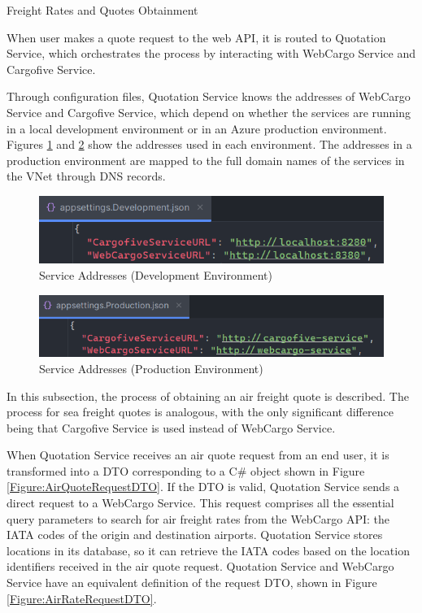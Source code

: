 \documentclass[12pt,reqno, oneside]{amsbook}
\makeatletter
\def\subsection{\@startsection{subsection}{2}%
      \z@{.5\linespacing\@plus.7\linespacing}{.25\linespacing}%
      {\normalfont\bfseries\flushleft}}
\theoremstyle{definition}
\theoremstyle{definition}
\numberwithin{section}{chapter}
\numberwithin{table}{chapter}
\numberwithin{figure}{chapter}
\makeatother
\begin{document}
\pagebreak

\subsection{Freight Rates and Quotes Obtainment}

When user makes a quote request to the web \ac{API}, it is routed to Quotation Service, which orchestrates the process by interacting with WebCargo Service and Cargofive Service.

Through configuration files, Quotation Service knows the addresses of WebCargo Service and Cargofive Service, which depend on whether the services are running in a local development environment or in an Azure production environment. Figures \ref{Figure:ServiceAddressesDevelopment} and \ref{Figure:ServiceAddressesProduction} show the addresses used in each environment. The addresses in a production environment are mapped to the full domain names of the services in the \ac{VNet} through \ac{DNS} records.

\begin{figure}[H]
  \centering
  \includegraphics[width=0.8\linewidth]{images/ServiceAddressesDevelopment.png}
  \caption{\label{Figure:ServiceAddressesDevelopment}Service Addresses (Development Environment)}
\end{figure}

\begin{figure}[H]
  \centering
  \includegraphics[width=0.8\linewidth]{images/ServiceAddressesProduction.png}
  \caption{\label{Figure:ServiceAddressesProduction}Service Addresses (Production Environment)}
\end{figure}

In this subsection, the process of obtaining an air freight quote is described. The process for sea freight quotes is analogous, with the only significant difference being that Cargofive Service is used instead of WebCargo Service.

When Quotation Service receives an air quote request from an end user, it is transformed into a \ac{DTO} corresponding to a C\# object shown in Figure \ref{Figure:AirQuoteRequestDTO}. If the \ac{DTO} is valid, Quotation Service sends a direct request to a WebCargo Service. This request comprises all the essential query parameters to search for air freight rates from the WebCargo \ac{API}: the \ac{IATA} codes of the origin and destination airports. Quotation Service stores locations in its database, so it can retrieve the \ac{IATA} codes based on the location identifiers received in the air quote request. Quotation Service and WebCargo Service have an equivalent definition of the request \ac{DTO}, shown in Figure \ref{Figure:AirRateRequestDTO}.
\end{document}
